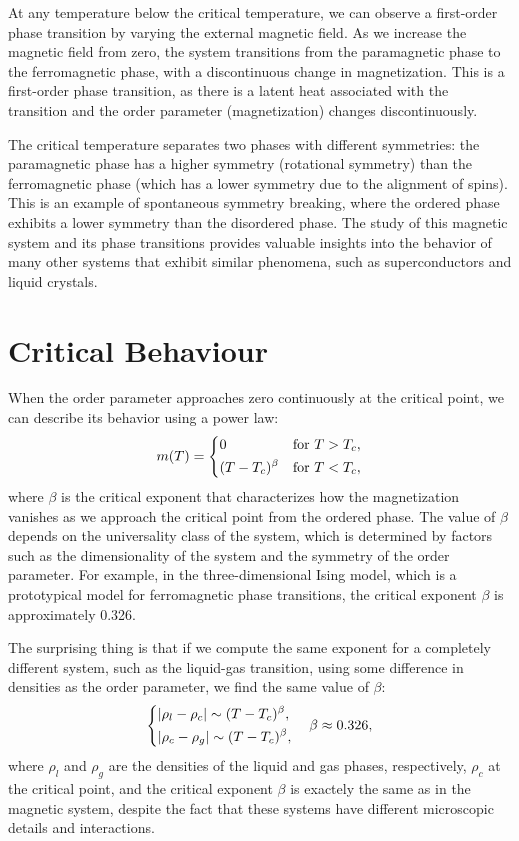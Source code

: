At any temperature below the critical temperature, we can observe a first-order phase transition by varying the external magnetic field. As we increase the magnetic field from zero, the system transitions from the paramagnetic phase to the ferromagnetic phase, with a discontinuous change in magnetization. This is a first-order phase transition, as there is a latent heat associated with the transition and the order parameter (magnetization) changes discontinuously.

The critical temperature separates two phases with different symmetries: the paramagnetic phase has a higher symmetry (rotational symmetry) than the ferromagnetic phase (which has a lower symmetry due to the alignment of spins). This is an example of spontaneous symmetry breaking, where the ordered phase exhibits a lower symmetry than the disordered phase. The study of this magnetic system and its phase transitions provides valuable insights into the behavior of many other systems that exhibit similar phenomena, such as superconductors and liquid crystals.

\section{Critical Behaviour}

When the order parameter approaches zero continuously at the critical point, we can describe its behavior using a power law:
\[
    m(T) = \begin{dcases}
        0               & \text{for } T > T_c, \\
        (T - T_c)^\beta & \text{for } T < T_c,
    \end{dcases}
\]
where $\beta$ is the critical exponent that characterizes how the magnetization vanishes as we approach the critical point from the ordered phase. The value of $\beta$ depends on the universality class of the system, which is determined by factors such as the dimensionality of the system and the symmetry of the order parameter. For example, in the three-dimensional Ising model, which is a prototypical model for ferromagnetic phase transitions, the critical exponent $\beta$ is approximately 0.326.

The surprising thing is that if we compute the same exponent for a completely different system, such as the liquid-gas transition, using some difference in densities as the order parameter, we find the same value of $\beta$:
\[
    \begin{dcases}
        \vert \rho_l - \rho_c \vert \sim (T - T_c)^\beta, \\
        \vert \rho_c - \rho_g \vert \sim (T - T_c)^\beta,
    \end{dcases} \quad \beta \approx 0.326,
\]
where $\rho_l$ and $\rho_g$ are the densities of the liquid and gas phases, respectively, \(\rho_c\) at the critical point, and the critical exponent $\beta$ is exactely the same as in the magnetic system, despite the fact that these systems have different microscopic details and interactions.

